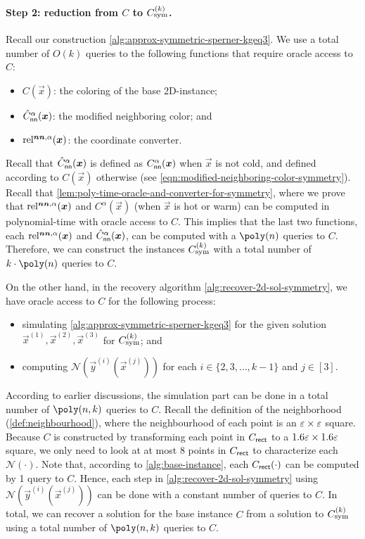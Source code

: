 \paragraph{Step 2: reduction from $C$ to $\Csym{k}$.} Recall our construction \cref{alg:approx-symmetric-sperner-kgeq3}.
We use a total number of $O(k)$ queries to the following functions that require oracle access to $C$:
\begin{itemize}[itemsep=0em, topsep=0.2em]
    \item $C(\vec{x})$: the coloring of the base $2${\rm D}-\Sperner instance;
    \item $\hat{C}_{\sf nn}^{\alpha}(\vec{x})$: the modified neighboring color; and 
    \item $\rela(\vec{x})$: the coordinate converter. 
\end{itemize}
Recall that $\hat{C}_{\sf nn}^{\alpha}(\vec{x})$ is defined as $C_{\sf nn}^{\alpha}(\vec{x})$ when $\vec{x}$ is not cold, and defined according to $C(\vec{x})$ otherwise (see \cref{eqn:modified-neighboring-color-symmetry}).
Recall that \cref{lem:poly-time-oracle-and-converter-for-symmetry}, where we prove that $\rela(\vec{x})$ and $C^{\alpha}(\vec{x})$ (when $\vec{x}$ is hot or warm) can be computed in polynomial-time with oracle access to $C$.
This implies that the 
last two functions, each $\rela(\vec{x})$ and $\hat{C}_{\sf nn}^{\alpha}(\vec{x})$, can be computed with a $\poly(n)$ queries to $C$. 
Therefore, we can construct the instances $\Csym{k}$ with a total number of $k\cdot \poly(n)$ queries to $C$. 

On the other hand, in the recovery algorithm \cref{alg:recover-2d-sol-symmetry}, we have oracle access to $C$ for the following process:
\begin{itemize}[itemsep=0em,topsep=0.5em]
    \item simulating \cref{alg:approx-symmetric-sperner-kgeq3} for the given solution $\vec{x}^{(1)}, \vec{x}^{(2)}, \vec{x}^{(3)}$ for $\Csym{k}$; and
    \item computing $\mathcal{N}(\vec{y}^{(i)}(\vec{x}^{(j)}))$ for each $i\in \{2,3,\dots,k-1\}$ and $j\in [3]$. 
\end{itemize}
According to earlier discussions, the simulation part can be done in a total number of $\poly(n,k)$ queries to $C$. 
Recall the definition of the neighborhood (\cref{def:neighbourhood}), where the neighbourhood of each point is an $\eps\times \eps$ square. 
Because $C$ is constructed by transforming each point in $C_{\rect}$ to a $1.6\eps\times 1.6\eps$ square, we only need to look at at most 8 points in $C_{\rect}$ to characterize each $\mathcal{N}(\cdot)$. 
Note that, according to \cref{alg:base-instance}, each $C_{\rect}(\cdot)$ can be computed by 1 query to $C$.
Hence, each step in \cref{alg:recover-2d-sol-symmetry} using $\mathcal{N}(\vec{y}^{(i)}(\vec{x}^{(j)}))$ can be done with a constant number of queries to $C$.
In total, we can recover a solution for the base instance $C$ from a solution to $\Csym{k}$ using a total number of $\poly(n,k)$ queries to $C$. 

